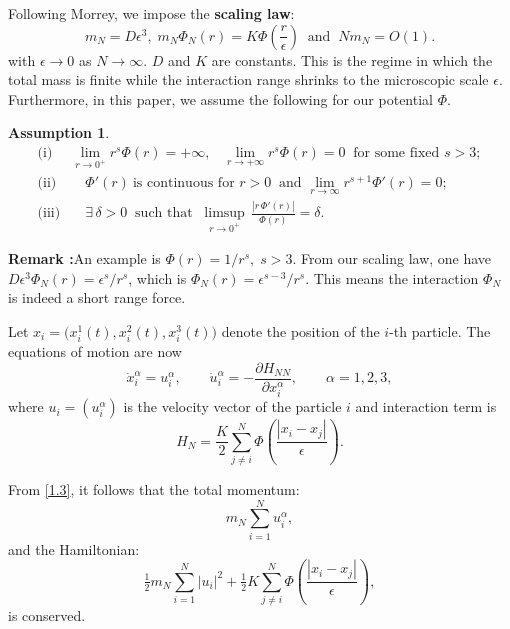 \documentclass[11pt]{article}
\newtheorem{assumption}{Assumption}
\begin{document}
Following Morrey, we impose the \textbf{scaling law}: 
\begin{equation}\label{1.1}\tag{1.1}
    m_N=D\epsilon^3,\; m_N\Phi_N(r)=K\Phi(\frac{r}{\epsilon}) \;\;\text{and}\;\;Nm_N= O(1).
\end{equation}
with $\epsilon\rightarrow 0$ as $N\rightarrow\infty$. $D$ and $K$ are constants. This is the regime in which the total mass is finite while the interaction range shrinks to the microscopic scale $\epsilon$.
Furthermore, in this paper,  we assume the following for our potential $\Phi$.
\begin{assumption}\label{Phi}
    \begin{equation}
\begin{aligned}
\text{(i)} &\lim_{r\rightarrow0^+}r^s\Phi(r)=+\infty,\;\;\;\lim_{r\rightarrow+\infty}r^s\Phi(r)=0\;\; \text{for some fixed $s>3$};\\
\text{(ii)} &\quad \Phi'(r)\ \text{is continuous for } r>0\ \text{ and } \lim_{r\to\infty} r^{s+1}\Phi'(r)=0;\\[-2pt]
\text{(iii)} &\quad \exists\,\delta>0\ \text{ such that }\ 
  \limsup_{r\to 0^+}\,\frac{|r\,\Phi'(r)|}{\Phi(r)}=\delta.
\end{aligned}
\label{1.2}\tag{1.2}
\end{equation}
\end{assumption}
\textbf{Remark :}An example is $\Phi(r)=1/r^s ,\; s>3$. From our scaling law, one have $D\epsilon^3\Phi_N(r)=\epsilon^s/r^s$, which is $\Phi_N(r)=\epsilon^{s-3}/r^s$. This means the interaction $\Phi_N$ is indeed a short range force.

Let 
$
x_i = \big(x_i^1(t), x_i^2(t), x_i^3(t)\big)
$ 
denote the position of the $i$-th particle. The equations of motion are now
\begin{equation*}\label{1.3}
\dot{x}_i^\alpha = u_i^\alpha, 
\qquad 
\dot{u}_i^\alpha = -\frac{\partial H_{NN}}{\partial x_i^\alpha}, 
\qquad \alpha = 1,2,3,
\tag{1.3}
\end{equation*}
where $u_i = (u_i^\alpha)$ is the velocity vector of the particle $i$ and interaction term is 
\[
 H_{N} = \frac{K}{2}\sum_{j \neq i}^N\Phi(\frac{|x_i - x_j|}{\epsilon}).
\]

\medskip
From \eqref{1.3}, it follows that the total momentum:
\[
m_N \sum_{i=1}^N u_i^\alpha,
\]
and the Hamiltonian:
\[
\tfrac{1}{2} m_N \sum_{i=1}^N |u_i|^2 + \tfrac{1}{2} K \sum_{j \neq i}^N \Phi(\frac{|x_i - x_j|}{\epsilon}),
\]
is conserved.
\end{document}
